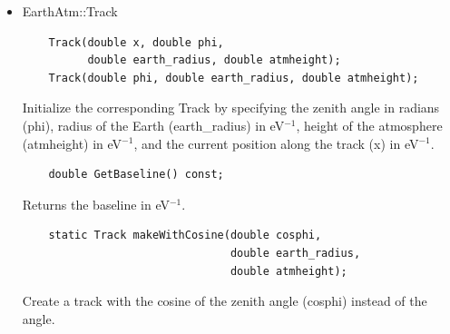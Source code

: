 \documentclass[3p,12pt]{elsarticle}
\newcommand{\ttf}{\ttfamily}
\begin{document}
\begin{itemize}
\item {\ttf EarthAtm::Track}
  \begin{lstlisting}
    Track(double x, double phi, 
          double earth_radius, double atmheight);
    Track(double phi, double earth_radius, double atmheight);
  \end{lstlisting}
  Initialize the corresponding {\ttf Track} by specifying the zenith
  angle in radians ({\ttf phi}), radius of the Earth ({\ttf earth\_radius}) in eV$^{-1}$, height of the atmosphere ({\ttf atmheight}) in eV$^{-1}$, and the current position along the
  track ({\ttf x}) in eV$^{-1}$.
  
  \begin{lstlisting}
    double GetBaseline() const;
  \end{lstlisting}
  Returns the baseline in eV$^{-1}$.

  \begin{lstlisting}
    static Track makeWithCosine(double cosphi, 
                                double earth_radius, 
                                double atmheight);
  \end{lstlisting}
  Create a track with the cosine of the zenith angle ({\ttf cosphi}) instead of the angle. 
  
\end{itemize}
\end{document}
